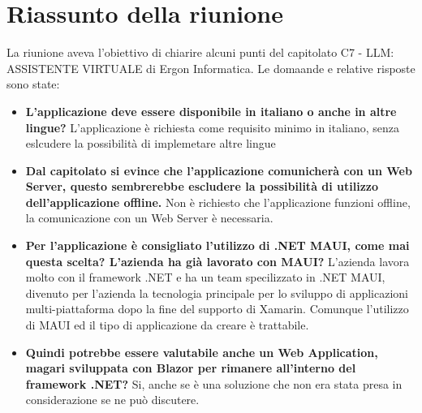 \section{Riassunto della riunione}

    La riunione aveva l'obiettivo di chiarire alcuni punti del capitolato C7 - LLM: ASSISTENTE VIRTUALE di Ergon Informatica. Le domaande e relative risposte sono state:
\begin{itemize}
    \item \textbf{L'applicazione deve essere disponibile in italiano o anche in altre lingue?} L'applicazione è richiesta come requisito minimo in italiano, senza eslcudere la possibilità di implemetare altre lingue
    \item \textbf{Dal capitolato si evince che l'applicazione comunicherà con un Web Server, questo sembrerebbe escludere la possibilità di utilizzo dell'applicazione offline.} Non è richiesto che l'applicazione funzioni offline, la comunicazione con un Web Server è necessaria.
     \item \textbf{Per l'applicazione è consigliato l'utilizzo di .NET MAUI, come mai questa scelta? L'azienda ha già lavorato con MAUI?} L'azienda lavora molto con il framework .NET e ha un team specilizzato in .NET MAUI, divenuto per l'azienda la tecnologia principale per lo sviluppo di applicazioni multi-piattaforma dopo la fine del supporto di Xamarin. Comunque l'utilizzo di MAUI ed il tipo di applicazione da creare è trattabile. 
            \item \textbf{Quindi potrebbe essere valutabile anche un Web Application, magari sviluppata con Blazor per rimanere all'interno del framework .NET?} Si, anche se è una soluzione che non era stata presa in considerazione se ne può discutere.

\end{itemize}


